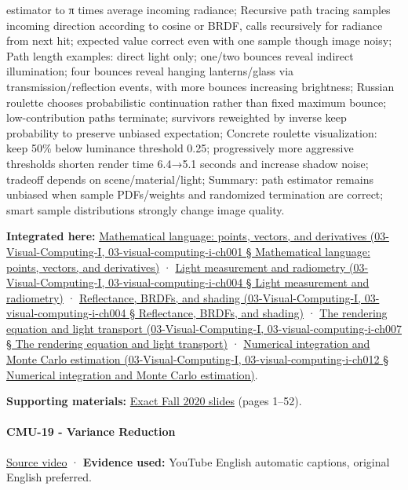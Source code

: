 estimator to π times average incoming radiance; Recursive path tracing samples incoming direction according to cosine or BRDF, calls recursively for radiance from next hit; expected value correct even with one sample though image noisy; Path length examples: direct light only; one/two bounces reveal indirect illumination; four bounces reveal hanging lanterns/glass via transmission/reflection events, with more bounces increasing brightness; Russian roulette chooses probabilistic continuation rather than fixed maximum bounce; low-contribution paths terminate; survivors reweighted by inverse keep probability to preserve unbiased expectation; Concrete roulette visualization: keep 50\% below luminance threshold 0.25; progressively more aggressive thresholds shorten render time 6.4→5.1 seconds and increase shadow noise; tradeoff depends on scene/material/light; Summary: path estimator remains unbiased when sample PDFs/weights and randomized termination are correct; smart sample distributions strongly change image quality.

\textbf{Integrated here:} \href{}{Mathematical language: points, vectors, and derivatives (03-Visual-Computing-I, 03-visual-computing-i-ch001 § Mathematical language: points, vectors, and derivatives)} · \href{}{Light measurement and radiometry (03-Visual-Computing-I, 03-visual-computing-i-ch004 § Light measurement and radiometry)} · \href{}{Reflectance, BRDFs, and shading (03-Visual-Computing-I, 03-visual-computing-i-ch004 § Reflectance, BRDFs, and shading)} · \href{}{The rendering equation and light transport (03-Visual-Computing-I, 03-visual-computing-i-ch007 § The rendering equation and light transport)} · \href{}{Numerical integration and Monte Carlo estimation (03-Visual-Computing-I, 03-visual-computing-i-ch012 § Numerical integration and Monte Carlo estimation)}.

\textbf{Supporting materials:} \href{https://15462.courses.cs.cmu.edu/fall2020content/lectures/18_montecarloraytracing/18_montecarloraytracing_slides.pdf}{Exact Fall 2020 slides} (pages 1--52).

\paragraph{CMU-19 - Variance Reduction}\label{cmu-19---variance-reduction}

\href{https://www.youtube.com/watch?v=IQhLk_XaFc8}{Source video} · \textbf{Evidence used:} YouTube English automatic captions, original English preferred.

